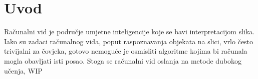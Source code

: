 \chapter{Uvod}

Računalni vid je područje umjetne inteligencije koje se bavi interpretacijom slika. Iako su zadaci računalnog vida, poput raspoznavanja objekata na slici, vrlo često trivijalni za čovjeka, gotovo nemoguće je osmisliti algoritme kojima bi računala mogla obavljati isti posao. Stoga se računalni vid oslanja na metode dubokog učenja, WIP
